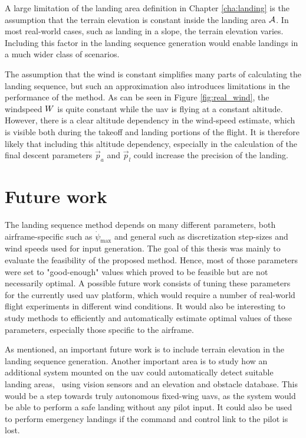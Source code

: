 A large limitation of the landing area definition in Chapter \ref{cha:landing} is the assumption that the terrain elevation is constant inside the landing area $\mathcal{A}$. In 
most real-world cases, such as landing in a slope, the terrain elevation varies. Including this factor in the landing sequence generation would enable landings in a much wider class of scenarios.

The assumption that the wind is constant simplifies many parts of calculating the landing sequence, but such an approximation also introduces limitations in the performance of the method. As can be seen in Figure \ref{fig:real_wind}, the windspeed $W$ is quite constant while the \ac{uav} is flying at a constant altitude. However, there is a clear altitude dependency in the 
wind-speed estimate, which is visible both during the takeoff and landing portions of the flight. It is therefore likely that including this altitude dependency, especially in the calculation of the final descent parameters $\vec{p}_a$ and $\vec{p}_l$ could increase the precision of the landing.

\section{Future work}
The landing sequence method depends on many different parameters, both air\-frame-specific such as $\dot{\psi}_{\text{max}}$ and general such as discretization step-sizes and wind speeds used for input generation.
The goal of this thesis was mainly to evaluate the feasibility of the proposed method. Hence, most of those parameters were set to "good-enough" values which proved to be feasible but are not necessarily optimal. 
A possible future work consists of tuning these parameters for the currently used \ac{uav} platform, which would require a number of real-world flight experiments in different wind conditions.
It would also be interesting to study methods to efficiently and automatically estimate optimal values of these parameters, especially those specific to the airframe.

As mentioned, an important future work is to include terrain elevation in the landing sequence generation. Another important area is to 
study how an additional system mounted on the \ac{uav} could automatically detect suitable landing areas, \eg\ using vision sensors and an elevation and obstacle database. 
This would be a step towards truly autonomous fixed-wing \acp{uav}, as the system would be able to perform a safe landing without any pilot input. It could also be used to perform 
emergency landings if the command and control link to the pilot is lost.